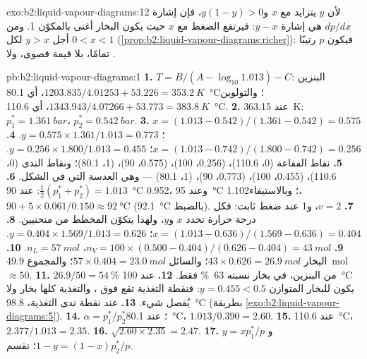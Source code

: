 \begin{solution}{exo:b2:liquid-vapour-diagrams:12}
لأن $y$ يتزايد مع $x$ و$y(1 - y) > 0$، فإن إشارة $dp/dx$ هي إشارة $y - x$:
فيرتفع الضغط مع $x$ حيث يكون البخار أغنى بالمكوّن 1. ومن أجل  $y > x$ لكل $0 < x < 1$ (\cref{prop:b2:liquid-vapour-diagrams:richer}):
فيكون $p$ رتيبًا تمامًا، بلا قيمة قصوى، ولا .
\end{solution}

\begin{solution}{pb:b2:liquid-vapour-diagrams:1}
\textbf{1.} $T = B/(A - \log_{10}1.013) - C$: البنزين $1203.835/4.01253 + 53.226 =
\qty{353.2}{K}$، أي \qty{80.1}{\degreeCelsius}؛ والتولوين $1343.943/4.07266 + 53.773 =
\qty{383.8}{K}$، أي \qty{110.6}{\degreeCelsius}.
\textbf{2.} عند \qty{363.15}{K}: $p_1^* = \qty{1.361}{bar}$، $p_2^* = \qty{0.542}{bar}$.
\textbf{3.} $x = (1.013 - 0.542)/(1.361 - 0.542) = 0.575$؛ $y = 0.575 \times
1.361/1.013 = 0.773$.
\textbf{4.} $x = (1.013 - 0.742)/(1.800 - 0.742) = 0.256$؛ $y = 0.256 \times
1.800/1.013 = 0.455$.
\textbf{5.} نقاط الفقاعة (0، 110.6)، (0.256، 100)، (0.575، 90)، (1، 80.1)؛ ونقاط
الندى (0، 110.6)، (0.455، 100)، (0.773، 90)، (1، 80.1) --- وهي العدسة التي في
الشكل.
\textbf{6.} $\frac12(p_1^* + p_2^*) = 1.013$: عند \qty{90}{\degreeCelsius} 0.952، وعند
\qty{95}{\degreeCelsius} 1.102؛ وبالاستيفاء، $90 + 5 \times 0.061/0.150 \approx
\qty{92}{\degreeCelsius}$ (\qty{92.1}{\degreeCelsius} بالضبط).
\textbf{7.} $v = 2$، و1 عند ضغط ثابت: فكل درجة حرارة تحدد $x$ و$y$،
ولهذا يتكوّن المخطط من منحنيين.
\textbf{8.} $x = (1.013 - 0.636)/(1.569 - 0.636) = 0.404$؛ $y = 0.404 \times
1.569/1.013 = 0.626$.
\textbf{9.} $n_V = 100 \times (0.500 - 0.404)/(0.626 - 0.404) = \qty{43}{mol}$،
$n_L = \qty{57}{mol}$.
\textbf{10.} البخار $43 \times 0.626 = \qty{26.9}{mol}$؛ والسائل $57 \times 0.404
= \qty{23.0}{mol}$؛ والمجموع \qty{49.9}{mol} $\approx 50$.
\textbf{11.} $26.9/50 = 54~\%$ من البنزين، في بخار نسبته 63~\% فقط.
\textbf{12.} عند \qty{100}{\degreeCelsius} يكون للبخار المتوازن $y =
0.455 < 0.5$: فنقطة التغذية تقع فوق ، والتغذية كلها
بخار ولا يُفصل شيء.
\textbf{13.} عند نقطة ندى التغذية، \qty{98.8}{\degreeCelsius} (بطريقة
\cref{exo:b2:liquid-vapour-diagrams:5}).
\textbf{14.} $\alpha = p_1^*/p_2^*$؛ عند \qty{80.1}{\degreeCelsius}، $1.013/0.390 =
2.60$.
\textbf{15.} عند \qty{110.6}{\degreeCelsius}، $2.377/1.013 = 2.35$.
\textbf{16.} $\sqrt{2.60 \times 2.35} = 2.47$.
\textbf{17.} $y = xp_1^*/p$ و$1 - y = (1 - x)p_2^*/p$؛ نقسم.

\end{solution}
